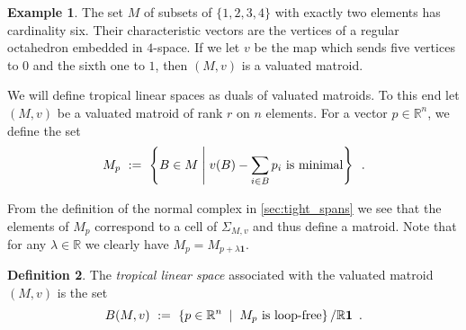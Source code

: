 \documentclass[11pt,a4paper]{amsart}
\theoremstyle{definition}
\newtheorem{definition}{Definition}[section]
\newtheorem{example}[definition]{Example}
\theoremstyle{plain}
\begin{document}
\begin{example}
  The set $M$ of subsets of $\{1,2,3,4\}$ with exactly two elements has cardinality six.
  Their characteristic vectors are the vertices of a regular octahedron embedded in $4$-space.
  If we let $v$ be the map which sends five vertices to $0$ and the sixth one to $1$, then $(M,v)$ is a valuated matroid.
\end{example}

We will define tropical linear spaces as duals of valuated matroids.
To this end let $(M,v)$ be a valuated matroid of rank $r$ on $n$ elements.
For a vector $p \in {\mathbb{R}}^n$, we define the set
\begin{equation}
 M_p \ := \ \left\{ B \in M \;\middle\vert\; v(B) - \sum_{i \in B} p_i \textnormal{ is minimal}\right\}\enspace. 
\end{equation}

From the definition of the normal complex in \ref{sec:tight_spans} we see that the elements of $M_p$ correspond to a cell of $\Sigma_{M,v}$ and thus define a matroid.
Note that for any $\lambda \in {\mathbb{R}}$ we clearly have $M_p = M_{p + \lambda {{\mathbf 1}}}$.

\begin{definition}
  The \emph{tropical linear space} associated with the valuated matroid $(M,v)$ is the set
  \begin{equation}
   B(M,v) \ := \ \left\{ p \in {\mathbb{R}}^n\;\mid\; M_p \textnormal{ is loop-free}\right\}/{\mathbb{R}}{{\mathbf 1}}\enspace.
  \end{equation}

\end{definition}
\end{document}
